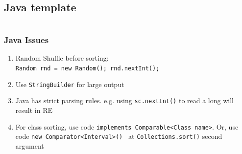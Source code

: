 \documentclass[10pt,oneside]{article}
\begin{document}
\begin{landscape}
\begin{multicols}{2}
			
			
			
			
			
			\subsection{Java template}
			\inputminted{java}{contest_setup/Main.java}
			
			\subsubsection{Java Issues}
			{\normalsize
				\begin{enumerate}
					\item Random Shuffle before sorting:\\ \texttt{Random rnd = new Random(); rnd.nextInt();}
					\item Use \texttt{StringBuilder} for large output
					\item Java has strict parsing rules. e.g. using \texttt{sc.nextInt()} to read a long will result in RE
					\item For class sorting, use code \texttt{implements Comparable<Class name>}. Or, use code \texttt{new Comparator<Interval>() {}} at \texttt{Collections.sort()} second argument
				\end{enumerate}
			}
			

\end{multicols}
\end{landscape}
\end{document}
